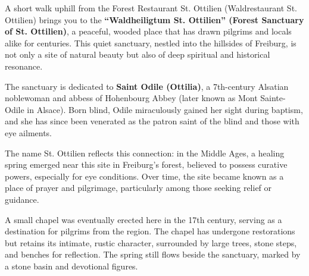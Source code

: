\documentclass[landscape, a4paper]{article}
\newcommand\alert[1]{\textcolor{PrimaryColor}{\textbf{#1}}}
\begin{document}
\begin{minipage}[t]{0.31\textwidth}
{		A short walk uphill from the Forest Restaurant St. Ottilien (Waldrestaurant St. Ottilien) brings you to the \alert{\enquote{Waldheiligtum St. Ottilien} (Forest Sanctuary of St. Ottilien)}, a peaceful, wooded place that has drawn pilgrims and locals alike for centuries. This quiet sanctuary, nestled into the hillsides of Freiburg, is not only a site of natural beauty but also of deep spiritual and historical resonance.

		The sanctuary is dedicated to \alert{Saint Odile (Ottilia)}, a 7th-century Alsatian noblewoman and abbess of Hohenbourg Abbey (later known as Mont Sainte-Odile in Alsace). Born blind, Odile miraculously gained her sight during baptism, and she has since been venerated as the patron saint of the blind and those with eye ailments.

		The name St. Ottilien reflects this connection: in the Middle Ages, a healing spring emerged near this site in Freiburg’s forest, believed to possess curative powers, especially for eye conditions. Over time, the site became known as a place of prayer and pilgrimage, particularly among those seeking relief or guidance.

		A small chapel was eventually erected here in the 17th century, serving as a destination for pilgrims from the region. The chapel has undergone restorations but retains its intimate, rustic character, surrounded by large trees, stone steps, and benches for reflection. The spring still flows beside the sanctuary, marked by a stone basin and devotional figures.
	}{
	}
\end{minipage}%
\hfill\color{white}%
\vrule width 0.01cm
\hfill\color{black}%
\begin{minipage}[t]{0.31\textwidth}
	\vspace{0cm}
	\setlength{\parskip}{0.25cm}

	\iftoggle{isEnglish}{
		The nearby Forest Restaurant St. Ottilien takes its name from this sacred site. Originally developed as a resting place for pilgrims and hikers, the restaurant honors the area’s history by providing a place of refreshment and hospitality near the sanctuary.

		On the way to the Zähringen Castle Ruin, we pass by the \alert{Forest Restaurant Zähringer Burg}, a charming woodland eatery nestled at the foot of the historic castle site. This restaurant offers a delightful stop for hikers and history enthusiasts alike. The Forest Restaurant Zähringer Burg is renowned for its regional and seasonal specialties. For those seeking lighter fare or a quick bite, the restaurant offers a selection of snacks and desserts, such as Homemade cakes and Ice cream desserts.
	}{
	}
\end{minipage}%
\end{document}
